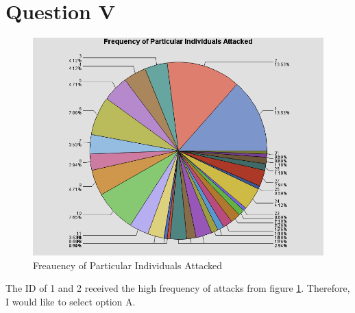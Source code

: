 \section*{Question V}

\begin{figure}[H]
\centering
\includegraphics[scale=0.5]{Pic/Q5/1.png}
\caption{Freauency of Particular Individuals Attacked}
\label{f11}
\end{figure}

The ID of 1 and 2 received the high frequency of attacks from figure \ref{f11}. Therefore, I would like to select option A.
